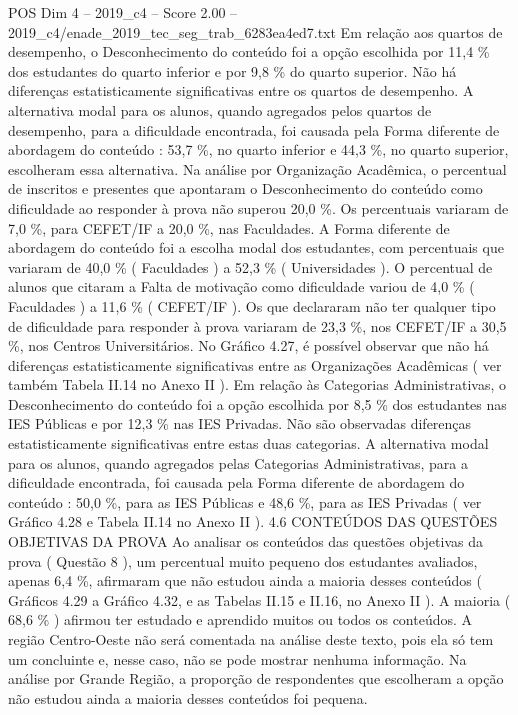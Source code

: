 \begin{textsample}{POS Dim 4 – 2019\_c4 – Score 2.00 – 2019\_c4/enade\_2019\_tec\_seg\_trab\_6283ea4ed7.txt}
Em relação aos quartos de desempenho, o Desconhecimento do conteúdo foi a opção escolhida por 11,4 \% dos estudantes do quarto inferior e por 9,8 \% do quarto superior.
Não há diferenças estatisticamente significativas entre os quartos de desempenho.
A alternativa modal para os alunos, quando agregados pelos quartos de desempenho, para a dificuldade encontrada, foi causada pela Forma diferente de abordagem do conteúdo : 53,7 \%, no quarto inferior e 44,3 \%, no quarto superior, escolheram essa alternativa.
Na análise por Organização Acadêmica, o percentual de inscritos e presentes que apontaram o Desconhecimento do conteúdo como dificuldade ao responder à prova não superou 20,0 \%.
Os percentuais variaram de 7,0 \%, para CEFET/IF a 20,0 \%, nas Faculdades.
A Forma diferente de abordagem do conteúdo foi a escolha modal dos estudantes, com percentuais que variaram de 40,0 \% ( Faculdades ) a 52,3 \% ( Universidades ).
O percentual de alunos que citaram a Falta de motivação como dificuldade variou de 4,0 \% ( Faculdades ) a 11,6 \% ( CEFET/IF ).
Os que declararam não ter qualquer tipo de dificuldade para responder à prova variaram de 23,3 \%, nos CEFET/IF a 30,5 \%, nos Centros Universitários.
No Gráfico 4.27, é possível observar que não há diferenças estatisticamente significativas entre as Organizações Acadêmicas ( ver também Tabela II.14 no Anexo II ).
Em relação às Categorias Administrativas, o Desconhecimento do conteúdo foi a opção escolhida por 8,5 \% dos estudantes nas IES Públicas e por 12,3 \% nas IES Privadas.
Não são observadas diferenças estatisticamente significativas entre estas duas categorias.
A alternativa modal para os alunos, quando agregados pelas Categorias Administrativas, para a dificuldade encontrada, foi causada pela Forma diferente de abordagem do conteúdo : 50,0 \%, para as IES Públicas e 48,6 \%, para as IES Privadas ( ver Gráfico 4.28 e Tabela II.14 no Anexo II ). 4.6 CONTEÚDOS DAS QUESTÕES OBJETIVAS DA PROVA Ao analisar os conteúdos das questões objetivas da prova ( Questão 8 ), um percentual muito pequeno dos estudantes avaliados, apenas 6,4 \%, afirmaram que não estudou ainda a maioria desses conteúdos ( Gráficos 4.29 a Gráfico 4.32, e as Tabelas II.15 e II.16, no Anexo II ).
A maioria ( 68,6 \% ) afirmou ter estudado e aprendido muitos ou todos os conteúdos.
A região Centro-Oeste não será comentada na análise deste texto, pois ela só tem um concluinte e, nesse caso, não se pode mostrar nenhuma informação.
Na análise por Grande Região, a proporção de respondentes que escolheram a opção não estudou ainda a maioria desses conteúdos foi pequena.

\end{textsample}
